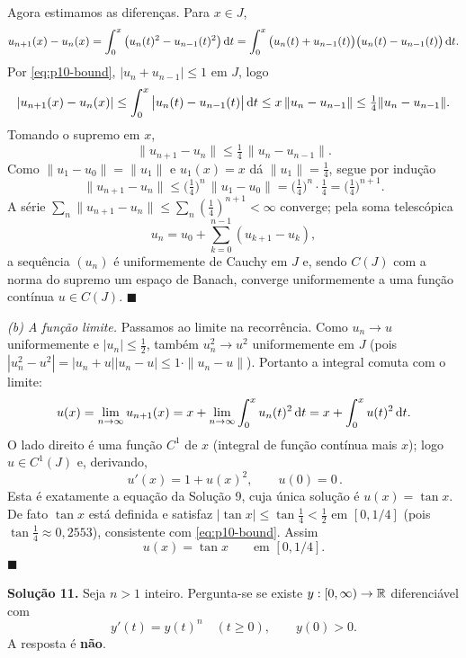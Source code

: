 Agora estimamos as diferenças. Para $x\in J$,
\[
u_{n+1}(x)-u_n(x)=\int_0^x\big(u_n(t)^2-u_{n-1}(t)^2\big)\,\mathrm{d} t
=\int_0^x\big(u_n(t)+u_{n-1}(t)\big)\big(u_n(t)-u_{n-1}(t)\big)\,\mathrm{d} t .
\]
Por \eqref{eq:p10-bound}, $|u_n+u_{n-1}|\le1$ em $J$, logo
\[
|u_{n+1}(x)-u_n(x)|\le\int_0^x\big|u_n(t)-u_{n-1}(t)\big|\,\mathrm{d} t\le x\,\|u_n-u_{n-1}\|\le\tfrac14\|u_n-u_{n-1}\| .
\]
Tomando o supremo em $x$,
\[
\|u_{n+1}-u_n\|\le\tfrac14\,\|u_n-u_{n-1}\| .
\]
Como $\|u_1-u_0\|=\|u_1\|$ e $u_1(x)=x$ dá $\|u_1\|=\tfrac14$, segue por indução
\[
\|u_{n+1}-u_n\|\le\Big(\tfrac14\Big)^{n}\,\|u_1-u_0\|=\Big(\tfrac14\Big)^{n}\cdot\tfrac14=\Big(\tfrac14\Big)^{n+1}.
\]
A série $\sum_n\|u_{n+1}-u_n\|\le\sum_n(\tfrac14)^{n+1}<\infty$ converge; pela soma telescópica
\[
u_n=u_0+\sum_{k=0}^{n-1}(u_{k+1}-u_k),
\]
a sequência $(u_n)$ é uniformemente de Cauchy em $J$ e, sendo $C(J)$ com a norma do supremo um espaço de Banach, converge uniformemente a uma função contínua $u\in C(J)$. \qquad$\blacksquare$

\emph{(b) A função limite.}
Passamos ao limite na recorrência. Como $u_n\to u$ uniformemente e $|u_n|\le\tfrac12$, também $u_n^2\to u^2$ uniformemente em $J$ (pois $|u_n^2-u^2|=|u_n+u||u_n-u|\le1\cdot\|u_n-u\|$). Portanto a integral comuta com o limite:
\[
u(x)=\lim_{n\to\infty}u_{n+1}(x)=x+\lim_{n\to\infty}\int_0^x u_n(t)^2\,\mathrm{d} t=x+\int_0^x u(t)^2\,\mathrm{d} t .
\]
O lado direito é uma função $C^1$ de $x$ (integral de função contínua mais $x$); logo $u\in C^1(J)$ e, derivando,
\[
\boxed{\,u'(x)=1+u(x)^2,\qquad u(0)=0\,}.
\]
Esta é exatamente a equação da Solução 9, cuja única solução é $u(x)=\tan x$. De fato $\tan x$ está definida e satisfaz $|\tan x|\le\tan\tfrac14<\tfrac12$ em $[0,1/4]$ (pois $\tan\tfrac14\approx0{,}2553$), consistente com \eqref{eq:p10-bound}. Assim
\[
u(x)=\tan x\qquad\text{em }[0,1/4].
\]
\qquad$\blacksquare$


\bigskip\noindent\textbf{Solução 11.}\quad
Seja $n>1$ inteiro. Pergunta-se se existe $y:[0,\infty)\to\mathbb{R}$ diferenciável com
\[
y'(t)=y(t)^n\quad(t\ge0),\qquad y(0)>0 .
\]
A resposta é \textbf{não}.

